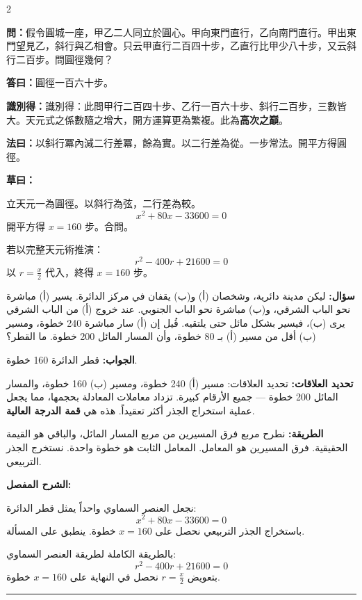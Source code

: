 \documentclass[11pt,a4paper]{article}
\newcommand{\ar}[1]{\arabicfont\beginR #1\endR}
\newcommand{\arb}[1]{\textbf{\arabicfont\beginR #1\endR}}
\newcommand{\longline}{\noindent\rule{\textwidth}{0.4pt}}
\newcommand{\arnote}[1]{\textcolor{arabicblue}{\ar{#1}}}
\newcommand{\wen}[1]{\par\noindent\textbf{\textcolor{probcolor}{問：}}{#1}\par}
\newcommand{\da}[1]{\par\noindent\textbf{\textcolor{anscolor}{答曰：}}{#1}\par}
\newcommand{\fayue}[1]{\par\noindent\textbf{\textcolor{methodcolor}{法曰：}}{#1}\par}
\newcommand{\caoyue}[1]{\par\noindent\textbf{草曰：}{#1}\par}
\newcommand{\zhi}[1]{\par\noindent\textbf{識別得：}{#1}\par}
\newcommand{\arwen}[1]{\par\noindent\arb{سؤال: }\arnote{#1}\par}
\newcommand{\arjwb}[1]{\par\noindent\arb{الجواب: }\arnote{#1}\par}
\newcommand{\arqwd}[1]{\par\noindent\arb{الطريقة: }\arnote{#1}\par}
\newcommand{\arshr}[1]{\par\noindent\arb{الشرح المفصل: }\arnote{#1}\par}
\newcommand{\arfl}[1]{\par\noindent\arb{تحديد العلاقات: }\arnote{#1}\par}
\begin{document}
\begin{paracol}{2}

\begin{leftcolumn}
\wen{假令圓城一座，甲乙二人同立於圓心。甲向東門直行，乙向南門直行。甲出東門望見乙，斜行與乙相會。只云甲直行二百四十步，乙直行比甲少八十步，又云斜行二百步。問圓徑幾何？}

\da{圓徑一百六十步。}

\zhi{識別得：此問甲行二百四十步、乙行一百六十步、斜行二百步，三數皆大。天元式之係數隨之增大，開方運算更為繁複。此為\textbf{高次之巔}。}

\fayue{以斜行冪內減二行差冪，餘為實。以二行差為從。一步常法。開平方得圓徑。}

\caoyue{
立天元一為圓徑。以斜行為弦，二行差為較。
$$x^2 + 80x - 33600 = 0$$
開平方得 $x = 160$ 步。合問。

若以完整天元術推演：
$$r^2 - 400r + 21600 = 0$$
以 $r = \frac{x}{2}$ 代入，終得 $x = 160$ 步。}
\end{leftcolumn}

\begin{rightcolumn}
\arwen{ليكن مدينة دائرية، وشخصان (أ) و(ب) يقفان في مركز الدائرة. يسير (أ) مباشرة نحو الباب الشرقي، و(ب) مباشرة نحو الباب الجنوبي. عند خروج (أ) من الباب الشرقي يرى (ب)، فيسير بشكل مائل حتى يلتقيه. قُيل إن (أ) سار مباشرة 240 خطوة، ومسير (ب) أقل من مسير (أ) بـ 80 خطوة، وأن المسار المائل 200 خطوة. ما القطر؟}

\arjwb{قطر الدائرة 160 خطوة.}

\arfl{تحديد العلاقات: مسير (أ) 240 خطوة، ومسير (ب) 160 خطوة، والمسار المائل 200 خطوة — جميع الأرقام كبيرة. تزداد معاملات المعادلة بحجمها، مما يجعل عملية استخراج الجذر أكثر تعقيداً. هذه هي \textbf{قمة الدرجة العالية}.}

\arqwd{نطرح مربع فرق المسيرين من مربع المسار المائل، والباقي هو القيمة الحقيقية. فرق المسيرين هو المعامل. المعامل الثابت هو خطوة واحدة. نستخرج الجذر التربيعي.}

\arshr{نجعل العنصر السماوي واحداً يمثل قطر الدائرة:
$$x^2 + 80x - 33600 = 0$$
باستخراج الجذر التربيعي نحصل على $x = 160$ خطوة. ينطبق على المسألة.

بالطريقة الكاملة لطريقة العنصر السماوي:
$$r^2 - 400r + 21600 = 0$$
بتعويض $r = \frac{x}{2}$ نحصل في النهاية على $x = 160$ خطوة.}
\end{rightcolumn}

\end{paracol}

\vspace{0.3cm}
\longline
\end{document}
